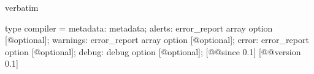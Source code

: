 \begin{camlexample}{verbatim}
\begin{caml}
\begin{camlinput}
type compiler = {
  metadata: metadata;
  alerts: error_report array option [@optional];
  warnings: error_report array option [@optional];
  error: error_report option [@optional];
  debug: debug option [@optional];
} [@@since 0.1]
[@@version 0.1]
\end{camlinput}
\end{caml}
\end{camlexample}
